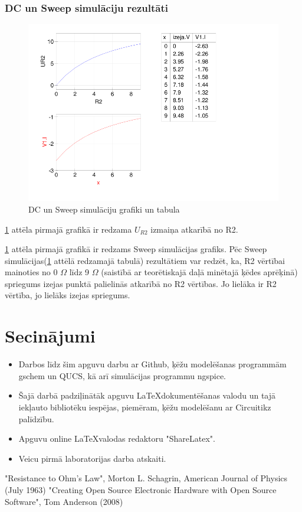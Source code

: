 \documentclass{report}
\begin{document}
   \subsection{DC un Sweep simulāciju rezultāti} 
    \begin{figure}[b!]
      \begin{center}
        \includegraphics[scale=0.45]{022.png}
      \end{center}
      \caption{DC un Sweep simulāciju grafiki un tabula}
      \label{att:qucs2}
    \end{figure}
    
\justify
  \ref{att:qucs2} attēla pirmajā grafikā ir redzama $U_{R2}$ izmaiņa atkarībā no R2.
  
  \smallskip

\justify
  \ref{att:qucs2} attēla pirmajā grafikā ir redzams Sweep simulācijas grafiks. Pēc Sweep simulācijas(\ref{att:qucs2} attēlā redzamajā tabulā) rezultātiem var redzēt, ka, R2 vērtībai mainoties no 0 $\Omega$ līdz 9 $\Omega$ (saistībā ar \pageref{theory:circuit} teorētiskajā daļā minētajā ķēdes aprēķinā) spriegums izejas punktā palielinās atkarībā no R2 vērtības. Jo lielāka ir R2 vērtība, jo lielāks izejas spriegums. 
    
\chapter{Secinājumi}
\begin{itemize}
    \item Darbos līdz šim apguvu darbu ar Github, ķēžu modelēšanas programmām gschem\cite{geda} un QUCS, kā arī simulācijas programmu ngspice.
    \item Šajā darbā padziļinātāk apguvu \LaTeX dokumentēšanas valodu un tajā iekļauto bibliotēku iespējas, piemēram, ķēžu modelēšanu ar Circuitikz palīdzību.
    \item Apguvu online \LaTeX valodas redaktoru "ShareLatex".
    \item Veicu pirmā laboratorijas darba atskaiti.
\end{itemize}
    
\begin{thebibliography}{1}
"Resistance to Ohm's Law", Morton L. Schagrin, American Journal of Physics (July 1963)
"Creating Open Source Electronic Hardware with Open Source Software", Tom Anderson (2008)
\end{thebibliography}
\end{document}
